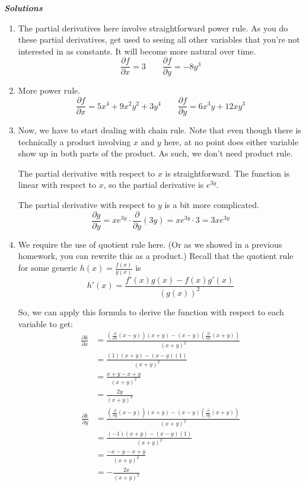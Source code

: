 \documentclass[10pt]{amsart}
\begin{document}
\textbf{\textit{Solutions}}
\begin{enumerate}
\item The partial derivatives here involve straightforward power rule. As you do these partial derivatives, get used to seeing all other variables that you're not interested in as constants. It will become more natural over time.
$$\frac{\partial f}{\partial x} = 3 \qquad \frac{\partial f}{\partial y} = -8y^3$$

\item More power rule.
$$\frac{\partial f}{\partial x} = 5x^4 + 9x^2y^2 + 3y^4 \qquad \frac{\partial f}{\partial y} = 6x^3y+12xy^3$$

\item Now, we have to start dealing with chain rule. Note that even though there is technically a product involving $x$ and $y$ here, at no point does either variable show up in both parts of the product. As such, we don't need product rule.

The partial derivative with respect to $x$ is straightforward. The function is linear with respect to $x$, so the partial derivative is $e^{3y}$.

The partial derivative with respect to $y$ is a bit more complicated.
$$\frac{\partial g}{\partial y} = xe^{3y} \cdot \frac{\partial}{\partial y}(3y) = xe^{3y} \cdot 3 = 3xe^{3y}$$

\item We require the use of quotient rule here. (Or as we showed in a previous homework, you can rewrite this as a product.) Recall that the quotient rule for some generic $h(x) = \frac{f(x)}{g(x)}$ is
$$h'(x) = \frac{f'(x)g(x)-f(x)g'(x)}{(g(x))^2}$$

So, we can apply this formula to derive the function with respect to each variable to get:
\begin{align*}
\frac{\partial k}{\partial x} &= \frac{(\frac{\partial}{\partial x} (x-y)) (x+y) - (x-y) (\frac{\partial}{\partial x} (x+y))}{(x+y)^2} \\
&= \frac{(1)(x+y) - (x-y)(1)}{(x+y)^2} \\
&= \frac{x+y-x+y}{(x+y)^2} \\
&= \frac{2y}{(x+y)^2}
\end{align*}
\begin{align*}
\frac{\partial k}{\partial y} &= \frac{(\frac{\partial}{\partial y} (x-y)) (x+y) - (x-y) (\frac{\partial}{\partial y} (x+y))}{(x+y)^2} \\
&= \frac{(-1)(x+y) - (x-y)(1)}{(x+y)^2} \\
&= \frac{-x-y-x+y}{(x+y)^2} \\
&= -\frac{2x}{(x+y)^2}
\end{align*}



\end{enumerate}
\end{document}
